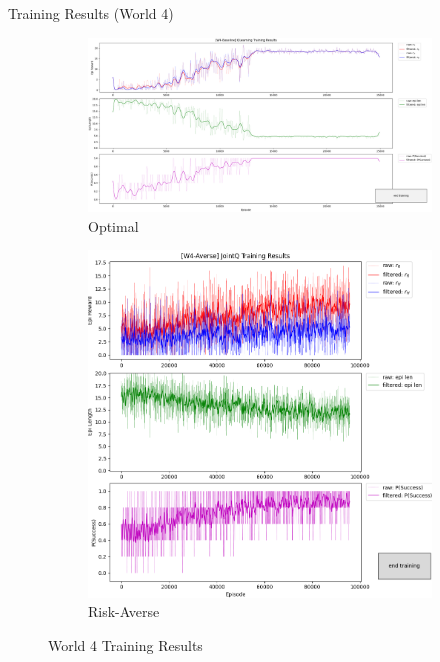 \documentclass[aspectratio=1610, xcolor=dvipsnames]{packages/beamer}
\begin{document}
\begin{frame}{Training Results (World 4)}
     \begin{figure}
     \centering
          \begin{subfigure}[b]{\Wfig\textwidth}  \centering
              \includegraphics[width=\textwidth]{../results/IDQN_W4/Fig_W4_JointQ_Baseline}
              \caption{Optimal} \label{fig:W4baseline}
          \end{subfigure}
          \hfill
         \begin{subfigure}[b]{\Wfig\textwidth} \centering
             \includegraphics[width=\textwidth]{../results/IDQN_W4/Fig_W4_JointQ_Averse}
             \caption{Risk-Averse} \label{fig:W4averse}
         \end{subfigure}
    \caption{World 4 Training Results}
    \label{fig:W4}
    \end{figure}
\end{frame}
\end{document}
